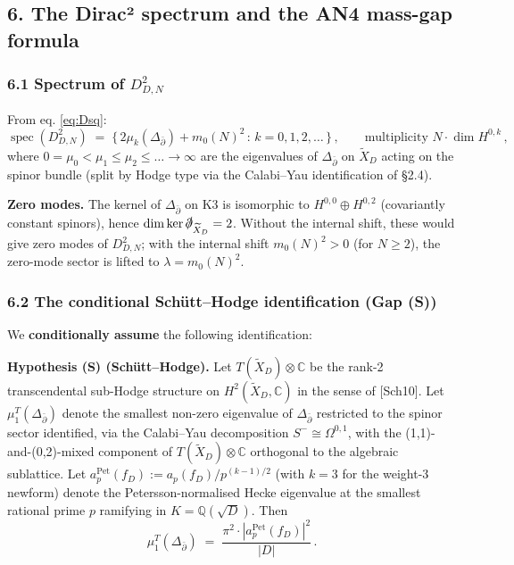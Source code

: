 \documentclass[
  11pt,
  a4paper,
]{amsart}
\begin{document}
\hypertarget{the-diracuxb2-spectrum-and-the-an4-mass-gap-formula}{%
\subsection{6. The Dirac² spectrum and the AN4 mass-gap formula}\label{the-diracuxb2-spectrum-and-the-an4-mass-gap-formula}}

\hypertarget{spectrum-of-d_dn2}{%
\subsubsection{\texorpdfstring{6.1 Spectrum of \(D_{D,N}^2\)}{6.1 Spectrum of D\_\{D,N\}\^{}2}}\label{spectrum-of-d_dn2}}

From eq. \eqref{eq:Dsq}:
\[
\operatorname{spec}(D_{D,N}^2) \;=\; \{\, 2\mu_k(\Delta_{\bar\partial}) + m_0(N)^2 \,:\, k = 0, 1, 2, \dots\,\}\,, \qquad \text{multiplicity } N \cdot \dim H^{0,k}\,,
\]
where \(0 = \mu_0 < \mu_1 \le \mu_2 \le \dots \to \infty\) are the eigenvalues of
\(\Delta_{\bar\partial}\) on \(\widetilde{X}_D\) acting on the spinor bundle (split
by Hodge type via the Calabi--Yau identification of §2.4).

\textbf{Zero modes.} The kernel of \(\Delta_{\bar\partial}\) on K3 is isomorphic to
\(H^{0,0} \oplus H^{0,2}\) (covariantly constant spinors), hence
\(\dim \ker \slashed{\partial}_{\widetilde{X}_D} = 2\). Without the internal
shift, these would give zero modes of \(D_{D,N}^2\); with the internal shift
\(m_0(N)^2 > 0\) (for \(N \ge 2\)), the zero-mode sector is lifted to
\(\lambda = m_0(N)^2\).

\hypertarget{the-conditional-schuxfctthodge-identification-gap-s}{%
\subsubsection{6.2 The conditional Schütt--Hodge identification (Gap (S))}\label{the-conditional-schuxfctthodge-identification-gap-s}}

We \textbf{conditionally assume} the following identification:

\textbf{Hypothesis (S) (Schütt--Hodge).} Let \(T(\widetilde{X}_D) \otimes \mathbb{C}\)
be the rank-2 transcendental sub-Hodge structure on
\(H^2(\widetilde{X}_D, \mathbb{C})\) in the sense of {[}Sch10{]}. Let
\(\mu_1^T(\Delta_{\bar\partial})\) denote the smallest non-zero eigenvalue of
\(\Delta_{\bar\partial}\) restricted to the spinor sector identified, via the
Calabi--Yau decomposition \(S^- \cong \Omega^{0,1}\), with the (1,1)-and-(0,2)-mixed
component of \(T(\widetilde{X}_D) \otimes \mathbb{C}\) orthogonal to the algebraic
sublattice. Let \(a_p^{\mathrm{Pet}}(f_D) := a_p(f_D) / p^{(k-1)/2}\) (with \(k = 3\)
for the weight-3 newform) denote the Petersson-normalised Hecke eigenvalue at
the smallest rational prime \(p\) ramifying in \(K = \mathbb{Q}(\sqrt{D})\). Then
\begin{equation}\label{eq:hyp-S}
\mu_1^T(\Delta_{\bar\partial}) \;=\; \frac{\pi^2 \cdot |a_p^{\mathrm{Pet}}(f_D)|^2}{|D|}\,.
\end{equation}
\end{document}
